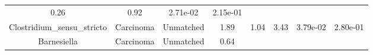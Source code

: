 \documentclass[12pt,]{article}
\begin{document}
\begin{longtable}[]{@{}cccccccc@{}}
\begin{minipage}[t]{0.13\columnwidth}
0.26\strut
\end{minipage} & \begin{minipage}[t]{0.13\columnwidth}\centering\strut
0.92\strut
\end{minipage} & \begin{minipage}[t]{0.07\columnwidth}\centering\strut
2.71e-02\strut
\end{minipage} & \begin{minipage}[t]{0.07\columnwidth}\centering\strut
2.15e-01\strut
\end{minipage}\tabularnewline
\begin{minipage}[t]{0.16\columnwidth}\centering\strut
Clostridium\_sensu\_stricto\strut
\end{minipage} & \begin{minipage}[t]{0.08\columnwidth}\centering\strut
Carcinoma\strut
\end{minipage} & \begin{minipage}[t]{0.09\columnwidth}\centering\strut
Unmatched\strut
\end{minipage} & \begin{minipage}[t]{0.05\columnwidth}\centering\strut
1.89\strut
\end{minipage} & \begin{minipage}[t]{0.13\columnwidth}\centering\strut
1.04\strut
\end{minipage} & \begin{minipage}[t]{0.13\columnwidth}\centering\strut
3.43\strut
\end{minipage} & \begin{minipage}[t]{0.07\columnwidth}\centering\strut
3.79e-02\strut
\end{minipage} & \begin{minipage}[t]{0.07\columnwidth}\centering\strut
2.80e-01\strut
\end{minipage}\tabularnewline
\begin{minipage}[t]{0.16\columnwidth}\centering\strut
Barnesiella\strut
\end{minipage} & \begin{minipage}[t]{0.08\columnwidth}\centering\strut
Carcinoma\strut
\end{minipage} & \begin{minipage}[t]{0.09\columnwidth}\centering\strut
Unmatched\strut
\end{minipage} & \begin{minipage}[t]{0.05\columnwidth}\centering\strut
0.64\strut
\end{minipage} & \begin{minipage}[t]{0.13\columnwidth}\centering\strut

\end{minipage}
\end{longtable}
\end{document}
